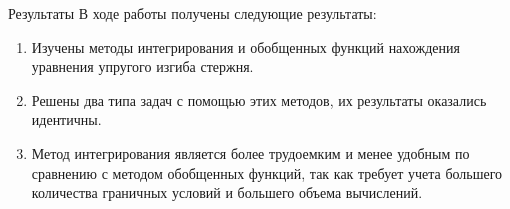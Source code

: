 \documentclass[ignoreonframetext,unicode]{beamer}
\begin{document}
\begin{frame}{Результаты}
	В ходе работы получены следующие результаты:
	\begin{block}{}
	\begin{enumerate}
		\item Изучены методы интегрирования и обобщенных функций нахождения уравнения упругого изгиба стержня.	
		\item Решены два типа задач с помощью этих методов, их результаты оказались идентичны.
		\item Метод интегрирования является более трудоемким и менее удобным по сравнению с методом обобщенных функций, так как требует учета большего количества граничных условий и большего объема вычислений.
	\end{enumerate}
	\end{block}	
\end{frame}	
\end{document}
